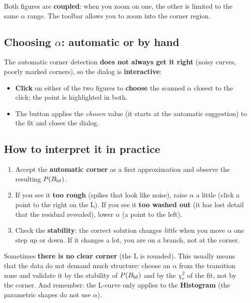 Both figures are \textbf{coupled}: when you zoom on one, the other is limited to the
same $\alpha$ range. The toolbar allows you to zoom into the corner region.


\subsection{Choosing $\alpha$: automatic or by hand}

The automatic corner detection \textbf{does not always get it right} (noisy curves,
poorly marked corners), so the dialog is \textbf{interactive}:

\begin{itemize}[nosep]
  \item \textbf{Click} on either of the two figures to \textbf{choose} the scanned
        $\alpha$ closest to the click; the point is highlighted in both.
  \item The  button applies the \emph{chosen} value (it starts
        at the automatic suggestion) to the fit and closes the dialog.
\end{itemize}

\subsection{How to interpret it in practice}

\begin{enumerate}[nosep]
  \item Accept the \textbf{automatic corner} as a first approximation and observe the
        resulting $P(B_{\mathrm{hf}})$.
  \item If you see it \textbf{too rough} (spikes that look like noise), raise $\alpha$
        a little (click a point to the right on the L). If you see it \textbf{too
        washed out} (it has lost detail that the residual revealed), lower $\alpha$
        (a point to the left).
  \item Check the \textbf{stability}: the correct solution changes \emph{little} when
        you move $\alpha$ one step up or down. If it changes a lot, you are on a
        branch, not at the corner.
\end{enumerate}

\begin{aviso}
Sometimes \textbf{there is no clear corner} (the L is rounded). This usually means
that the data do not demand much structure: choose an $\alpha$ from the transition
zone and validate it by the stability of $P(B_{\mathrm{hf}})$ and by the $\chi^2_r$ of the fit,
not by the corner. And remember: the L-curve only applies to the \textbf{Histogram}
(the parametric shapes do not use $\alpha$).
\end{aviso}

